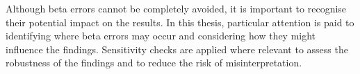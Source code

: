 Although beta errors cannot be completely avoided, it is important to recognise their potential impact on the results. 
In this thesis, particular attention is paid to identifying where beta errors may occur and considering how they might influence the findings. 
Sensitivity checks are applied where relevant to assess the robustness of the findings and to reduce the risk of misinterpretation. %




